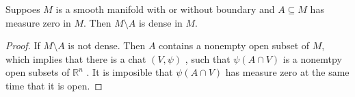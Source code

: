\documentclass[../main.tex]{subfiles}
\begin{document}
\begin{proposition}{}{}
    Suppoes \(  M  \) is a smooth manifold with or without boundary and \(  A\subseteq M  \) has measure zero in  \(  M  \). Then \(  M\setminus A  \) is dense in \(  M  \).      
\end{proposition}
\begin{proof}
    If  \(  M\setminus A  \) is not dense. Then \(  A  \) contains a nonempty open subset of \(  M  \), which implies that there is a chat \(  \left( V,\psi  \right)   \) , such that  \(  \psi \left( A\cap V \right)   \) is a nonemtpy open subsets of \(  \mathbb{R} ^{n}  \) . It is imposible that  \(  \psi \left( A\cap V \right)   \) has measure zero at the same time that it is open.          
\end{proof}
\end{document}
